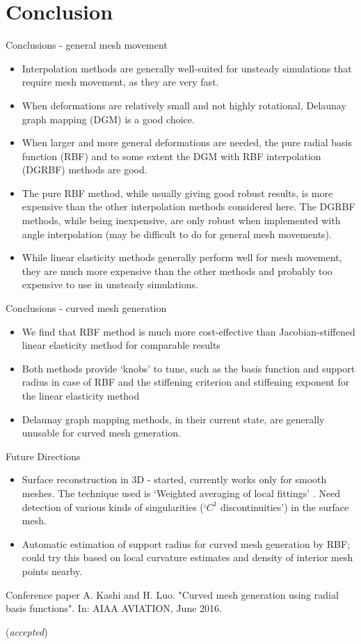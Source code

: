 \documentclass[t,12pt]{beamer}
\begin{document}
\section{Conclusion}
\begin{frame}[allowframebreaks]{Conclusions - general mesh movement}
\begin{itemize}
\item Interpolation methods are generally well-suited for unsteady simulations that require mesh movement, as they are very fast.
\item When deformations are relatively small and not highly rotational, Delaunay graph mapping (DGM) is a good choice.
\item When larger and more general deformations are needed, the pure radial basis function (RBF) and to some extent the DGM with RBF interpolation (DGRBF) methods are good. 
\item The pure RBF method, while usually giving good robust results, is more expensive than the other interpolation methods considered here. The DGRBF methods, while being inexpensive, are only robust when implemented with angle interpolation (may be difficult to do for general mesh movements).
\item While linear elasticity methods generally perform well for mesh movement, they are much more expensive than the other methods and probably too expensive to use in unsteady simulations.
\end{itemize}
\end{frame}
\begin{frame}{Conclusions - curved mesh generation}
\begin{itemize}
	\item We find that RBF method is much more cost-effective than Jacobian-stiffened linear elasticity method for comparable results
	\item Both methods provide `knobs' to tune, such as the basis function and support radius in case of RBF and the stiffening criterion and stiffening exponent for the linear elasticity method
	\item Delaunay graph mapping methods, in their current state, are generally unusable for curved mesh generation.
\end{itemize}
\end{frame}
\begin{frame}{Future Directions}
\begin{itemize}
	\item Surface reconstruction in 3D - started, currently works only for smooth meshes. The technique used is `Weighted averaging of local fittings' . 
	Need detection of various kinds of singularities (`$C^1$ discontinuities') in the surface mesh.
	\item Automatic estimation of support radius for curved mesh generation by RBF; could try this based on local curvature estimates and density of interior mesh points nearby.
\end{itemize}
\end{frame}

\begin{frame}{Conference paper}
	A. Kashi and H. Luo. "Curved mesh generation using radial basis functions". In: AIAA AVIATION, June 2016. 
	
	(\emph{accepted})
\end{frame}

\printbibliography
\end{document}
